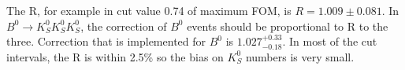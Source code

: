 The R, for example in cut value 0.74 of maximum FOM, is $R = 1.009\pm 0.081$. In $B^0 \to K_S^0  K_S^0  K_S^0$, the correction of $B^0$ events should be proportional to R to the three.  Correction that is implemented for $B^0$ is $1.027^{+0.33}_{-0.18}$. In most of the cut intervals, the R is within 2.5\% so the bias on $K_S^0$ numbers is very small.
\begin{comment}
\subsection{Summary}
The development of Belle II $K_S^0$ classifier is enlighten by the experience from Belle. A comprehensive study of training observables from $K_S^0$ decay characteristics has been exploited. It takes the advantage of FastBDT algorithm to achieve a high fake rejection power. As a result, classifier is able to give a output which can be used as a cut to select good $K_S^0$ candidates with high purity. The classifier is validated with real experimental data as well. A primary data validation study of KsFinder is conducted with implementing correction on data and MC along with its contribution to $B^0$. The performance of KsFinder is in a good shape and no clear bias is found on the yield of the number of $K_S^0$. For the reconstruction of $B^0 \to K_S^0  K_S^0  K_S^0$, the development of KsFinder is critical to suppress large fraction of combination background from fake $K_S^0$.
\end{comment}
